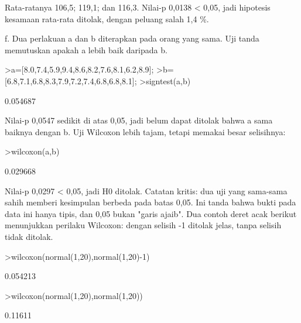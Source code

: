 \documentclass[a4paper,10pt]{article}
\begin{document}
\begin{eulernotebook}
\begin{eulercomment}
\begin{eulercomment}
\begin{eulercomment}
\begin{eulercomment}
\begin{eulercomment}
\begin{eulercomment}
\begin{eulercomment}
\begin{eulercomment}
\begin{eulercomment}
\begin{eulercomment}
\begin{eulercomment}
\begin{eulercomment}
\begin{eulercomment}
\begin{eulercomment}
\begin{eulercomment}
\begin{eulercomment}
\begin{eulercomment}
\begin{eulercomment}
\begin{eulercomment}
\begin{eulercomment}
\begin{eulercomment}
\begin{eulercomment}
\begin{eulercomment}
Rata-ratanya 106,5; 119,1; dan 116,3. Nilai-p 0,0138 \textless{} 0,05, jadi hipotesis kesamaan rata-rata
ditolak, dengan peluang salah 1,4 \%.

f. Dua perlakuan a dan b diterapkan pada orang yang sama. Uji tanda memutuskan apakah a
lebih baik daripada b.
\end{eulercomment}
\begin{eulerprompt}
>a=[8.0,7.4,5.9,9.4,8.6,8.2,7.6,8.1,6.2,8.9];
>b=[6.8,7.1,6.8,8.3,7.9,7.2,7.4,6.8,6.8,8.1];
>signtest(a,b)
\end{eulerprompt}
\begin{euleroutput}
  0.054687
\end{euleroutput}
\begin{eulercomment}
Nilai-p 0,0547 sedikit di atas 0,05, jadi belum dapat ditolak bahwa a sama baiknya dengan b.
Uji Wilcoxon lebih tajam, tetapi memakai besar selisihnya:
\end{eulercomment}
\begin{eulerprompt}
>wilcoxon(a,b)
\end{eulerprompt}
\begin{euleroutput}
  0.029668
\end{euleroutput}
\begin{eulercomment}
Nilai-p 0,0297 \textless{} 0,05, jadi H0 ditolak. Catatan kritis: dua uji yang sama-sama sahih
memberi kesimpulan berbeda pada batas 0,05. Ini tanda bahwa bukti pada data ini hanya
tipis, dan 0,05 bukan "garis ajaib". Dua contoh deret acak berikut menunjukkan perilaku
Wilcoxon: dengan selisih -1 ditolak jelas, tanpa selisih tidak ditolak.
\end{eulercomment}
\begin{eulerprompt}
>wilcoxon(normal(1,20),normal(1,20)-1)
\end{eulerprompt}
\begin{euleroutput}
  0.054213
\end{euleroutput}
\begin{eulerprompt}
>wilcoxon(normal(1,20),normal(1,20))
\end{eulerprompt}
\begin{euleroutput}
  0.11611
\end{euleroutput}
\begin{eulercomment}
\begin{eulercomment}

\end{eulercomment}
\end{eulercomment}
\end{eulercomment}
\end{eulercomment}
\end{eulercomment}
\end{eulercomment}
\end{eulercomment}
\end{eulercomment}
\end{eulercomment}
\end{eulercomment}
\end{eulercomment}
\end{eulercomment}
\end{eulercomment}
\end{eulercomment}
\end{eulercomment}
\end{eulercomment}
\end{eulercomment}
\end{eulercomment}
\end{eulercomment}
\end{eulercomment}
\end{eulercomment}
\end{eulercomment}
\end{eulercomment}
\end{eulercomment}
\end{eulernotebook}
\end{document}

